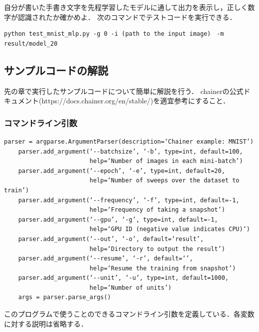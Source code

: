 \begin{practice}
自分が書いた手書き文字を先程学習したモデルに通して出力を表示し，正しく数字が認識されたか確かめよ．
次のコマンドでテストコードを実行できる．
\begin{lstlisting}[basicstyle=\ttfamily\footnotesize, frame=single]
python test_mnist_mlp.py -g 0 -i (path to the input image)　-m result/model_20
\end{lstlisting}

\end{practice}

\subsection{サンプルコードの解説}
先の章で実行したサンプルコードについて簡単に解説を行う．
chainerの公式ドキュメント(https://docs.chainer.org/en/stable/)を適宜参考にすること．

\subsubsection{コマンドライン引数}
\begin{lstlisting}[basicstyle=\ttfamily\footnotesize, frame=single]
    parser = argparse.ArgumentParser(description=‘Chainer example: MNIST’)
    parser.add_argument(‘--batchsize’, ‘-b’, type=int, default=100,
                        help=‘Number of images in each mini-batch’)
    parser.add_argument(‘--epoch’, ‘-e’, type=int, default=20,
                        help=‘Number of sweeps over the dataset to train’)
    parser.add_argument(‘--frequency’, ‘-f’, type=int, default=-1,
                        help=‘Frequency of taking a snapshot’)
    parser.add_argument(‘--gpu’, ‘-g’, type=int, default=-1,
                        help=‘GPU ID (negative value indicates CPU)‘)
    parser.add_argument(‘--out’, ‘-o’, default=‘result’,
                        help=‘Directory to output the result’)
    parser.add_argument(‘--resume’, ‘-r’, default=‘’,
                        help=‘Resume the training from snapshot’)
    parser.add_argument(‘--unit’, ‘-u’, type=int, default=1000,
                        help=‘Number of units’)
    args = parser.parse_args()
\end{lstlisting}
このプログラムで使うことのできるコマンドライン引数を定義している．各変数に対する説明は省略する．

